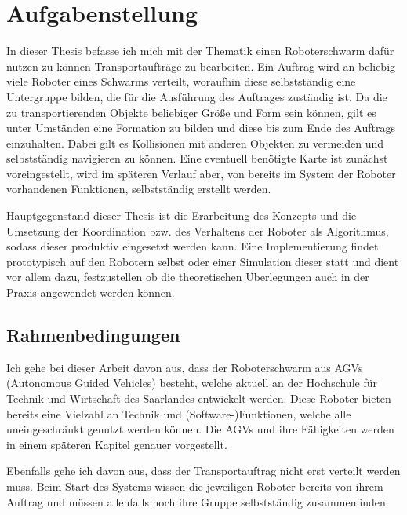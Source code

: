 \section{Aufgabenstellung}
In dieser Thesis befasse ich mich mit der Thematik einen Roboterschwarm dafür nutzen zu können Transportaufträge zu bearbeiten. Ein Auftrag wird an beliebig viele Roboter eines Schwarms verteilt, woraufhin diese selbstständig eine Untergruppe bilden, die für die Ausführung des Auftrages zuständig ist. Da die zu transportierenden Objekte beliebiger Größe und Form sein können, gilt es unter Umständen eine Formation zu bilden und diese bis zum Ende des Auftrags einzuhalten. Dabei gilt es Kollisionen mit anderen Objekten zu vermeiden und selbstständig navigieren zu können. Eine eventuell benötigte Karte ist zunächst voreingestellt, wird im späteren Verlauf aber, von bereits im System der Roboter vorhandenen Funktionen, selbstständig erstellt werden.

Hauptgegenstand dieser Thesis ist die Erarbeitung des Konzepts und die Umsetzung der Koordination bzw. des Verhaltens der Roboter als Algorithmus, sodass dieser produktiv eingesetzt werden kann. Eine Implementierung findet prototypisch auf den Robotern selbst oder einer Simulation dieser statt und dient vor allem dazu, festzustellen ob die theoretischen Überlegungen auch in der Praxis angewendet werden können.

\subsection*{Rahmenbedingungen}
Ich gehe bei dieser Arbeit davon aus, dass der Roboterschwarm aus AGVs (Autonomous Guided Vehicles) besteht, welche aktuell an der Hochschule für Technik und Wirtschaft des Saarlandes entwickelt werden. Diese Roboter bieten bereits eine Vielzahl an Technik und (Software-)Funktionen, welche alle uneingeschränkt genutzt werden können. Die AGVs und ihre Fähigkeiten werden in einem späteren Kapitel genauer vorgestellt.

Ebenfalls gehe ich davon aus, dass der Transportauftrag nicht erst verteilt werden muss. Beim Start des Systems wissen die jeweiligen Roboter bereits von ihrem Auftrag und müssen allenfalls noch ihre Gruppe selbstständig zusammenfinden.

